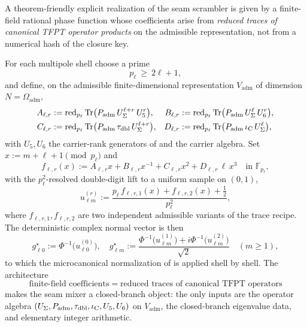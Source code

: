 \begin{remark}
\label{rem:finite-field-seam-mixer}
A theorem-friendly explicit realization of the seam scrambler is given by a finite-field rational
phase function whose coefficients arise from \emph{reduced traces of canonical TFPT operator
products} on the admissible representation, not from a numerical hash of the closure key.

For each multipole shell choose a prime
\[
p_\ell\ \ge\ 2\ell+1,
\]
and define, on the admissible finite-dimensional representation $V_{\mathrm{adm}}$ of dimension
$N=\Omega_{\mathrm{adm}}$,
\begin{align}
A_{\ell,r}
&:=\operatorname{red}_{p_\ell}
\operatorname{Tr}\bigl(P_{\mathrm{adm}}\,U_\Sigma^{\ell+r}\,U_5^{r}\bigr),
&
B_{\ell,r}
&:=\operatorname{red}_{p_\ell}
\operatorname{Tr}\bigl(P_{\mathrm{adm}}\,U_\Sigma^{\ell}\,U_6^{r}\bigr),
\\
C_{\ell,r}
&:=\operatorname{red}_{p_\ell}
\operatorname{Tr}\bigl(P_{\mathrm{adm}}\,\tau_{\mathrm{dbl}}\,U_\Sigma^{\ell+r}\bigr),
&
D_{\ell,r}
&:=\operatorname{red}_{p_\ell}
\operatorname{Tr}\bigl(P_{\mathrm{adm}}\,\iota_{\mathrm C}\,U_\Sigma^{\ell}\bigr),
\end{align}
with $U_5,U_6$ the carrier-rank generators of  and the carrier
algebra. Set $x:=m+\ell+1\pmod{p_\ell}$ and
\[
f_{\ell,r}(x)
:=
A_{\ell,r}x+B_{\ell,r}x^{-1}+C_{\ell,r}x^2+D_{\ell,r}\,\ell\,x^3
\quad
\text{in }\mathbb F_{p_\ell},
\]
with the $p_\ell^2$-resolved double-digit lift to a uniform sample on $(0,1)$,
\[
u_{\ell m}^{(r)}
:=
\frac{p_\ell\,f_{\ell,r,1}(x)+f_{\ell,r,2}(x)+\tfrac{1}{2}}{p_\ell^2},
\]
where $f_{\ell,r,1},f_{\ell,r,2}$ are two independent admissible variants of the trace recipe.
The deterministic complex normal vector is then
\[
g_{\ell 0}^{\star}:=\Phi^{-1}\!\bigl(u_{\ell 0}^{(0)}\bigr),
\quad
g_{\ell m}^{\star}:=
\frac{\Phi^{-1}\!\bigl(u_{\ell m}^{(1)}\bigr)
+i\Phi^{-1}\!\bigl(u_{\ell m}^{(2)}\bigr)}{\sqrt{2}}
\quad(m\ge1),
\]
to which the microcanonical normalization of  is applied
shell by shell. The architecture
\[
\boxed{\;\text{finite-field coefficients}\;=\;\text{reduced traces of canonical TFPT operators}\;}
\]
makes the seam mixer a closed-branch object: the only inputs are the operator algebra
$(U_\Sigma,P_{\mathrm{adm}},\tau_{\mathrm{dbl}},\iota_{\mathrm C},U_5,U_6)$ on $V_{\mathrm{adm}}$, the closed-branch eigenvalue data,
and elementary integer arithmetic.
\end{remark}

